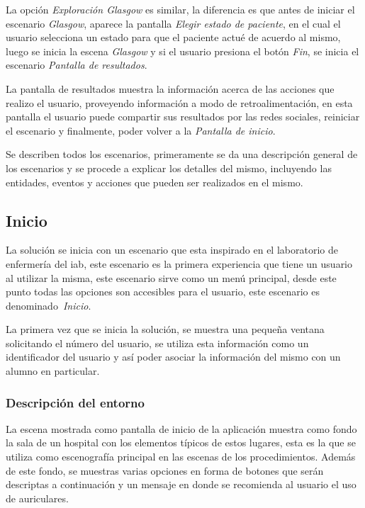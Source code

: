 La opción \emph{Exploración Glasgow} es similar, la diferencia es que antes de
iniciar el escenario \emph{Glasgow}, aparece la pantalla \emph{Elegir estado de
    paciente}, en el cual el usuario selecciona un estado para que el paciente
actué de acuerdo al mismo, luego se inicia la escena \emph{Glasgow} y si el
usuario presiona el botón \emph{Fin}, se inicia el escenario \emph{Pantalla de
    resultados}.

La pantalla de resultados muestra la información acerca de las acciones que
realizo el usuario, proveyendo información a modo de retroalimentación, en esta
pantalla el usuario puede compartir sus resultados por las redes sociales,
reiniciar el escenario y finalmente, poder volver a la \emph{Pantalla de
    inicio}.

Se describen todos los escenarios, primeramente se da una descripción general de
los escenarios y se procede a explicar los detalles del mismo, incluyendo las
entidades, eventos y acciones que pueden ser realizados en el mismo.

\subsection{Inicio}

La solución se inicia con un escenario que esta inspirado en el laboratorio de
enfermería del \Gls{iab}, este escenario es la primera experiencia que tiene un
usuario al utilizar la misma, este escenario sirve como un menú principal, desde
este punto todas las opciones son accesibles para el usuario, este escenario es
denominado~\emph{Inicio}.

La primera vez que se inicia la solución, se muestra una pequeña ventana
solicitando el número del usuario, se utiliza esta información como un
identificador del usuario y así poder asociar la información del mismo con un
alumno en particular.

\subsubsection{Descripción del entorno}
\label{sec:inicio_descripcion}

La escena mostrada como pantalla de inicio de la aplicación muestra como fondo
la sala de un hospital con los elementos típicos de estos lugares, esta es la
que se utiliza como escenografía principal en las escenas de los procedimientos.
Además de este fondo, se muestras varias opciones en forma de botones que serán
descriptas a continuación y un mensaje en donde se recomienda al usuario el uso
de auriculares.

